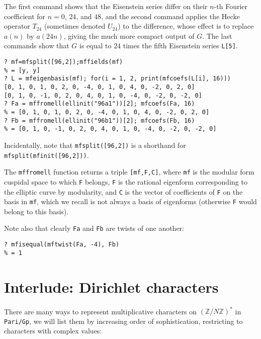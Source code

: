 \documentclass[11pt]{article}
\newcommand{\Z}{{\mathbb Z}}
\def\kbd#1{{\tt #1}}
\begin{document}
The first command shows that the Eisenstein series differ on their $n$-th
Fourier coefficient for $n=0$, $24$, and $48$, and the second command applies
the Hecke operator $T_{24}$ (sometimes denoted $U_{24}$) to the difference,
whose effect is to replace $a(n)$ by $a(24n)$, giving the much more
compact output of $G$. The last commands show that $G$ is equal to
$24$ times the fifth Eisenstein series \kbd{L[5]}.

\begin{verbatim}
? mf=mfsplit([96,2]);mffields(mf)
% = [y, y]
? L = mfeigenbasis(mf); for(i = 1, 2, print(mfcoefs(L[i], 16)))
[0, 1, 0, 1, 0, 2, 0, -4, 0, 1, 0, 4, 0, -2, 0, 2, 0]
[0, 1, 0, -1, 0, 2, 0, 4, 0, 1, 0, -4, 0, -2, 0, -2, 0]
? Fa = mffromell(ellinit("96a1"))[2]; mfcoefs(Fa, 16)
% = [0, 1, 0, 1, 0, 2, 0, -4, 0, 1, 0, 4, 0, -2, 0, 2, 0]
? Fb = mffromell(ellinit("96b1"))[2]; mfcoefs(Fb, 16)
% = [0, 1, 0, -1, 0, 2, 0, 4, 0, 1, 0, -4, 0, -2, 0, -2, 0]
\end{verbatim}

Incidentally, note that \kbd{mfsplit([96,2])} is a shorthand for
\kbd{mfsplit(mfinit([96,2]))}.

The \kbd{mffromell} function returns a triple \kbd{[mf,F,C]},
where \kbd{mf} is the modular form cuspidal space to which \kbd{F} belongs,
\kbd{F} is the rational eigenform corresponding to the elliptic curve by
modularity, and \kbd{C} is the vector of coefficients of \kbd{F} on the
basis in \kbd{mf}, which we recall is not always a basis of eigenforms
(otherwise \kbd{F} would belong to this basis).

Note also that clearly \kbd{Fa} and \kbd{Fb} are twists of one another:

\begin{verbatim}
? mfisequal(mftwist(Fa, -4), Fb)
% = 1
\end{verbatim}

\section{Interlude: Dirichlet characters}

There are many ways to represent multiplicative characters on $(\Z/N\Z)^*$ in
\kbd{Pari/Gp}, we will list them by increasing order of sophistication,
restricting to characters with complex values:
\end{document}
